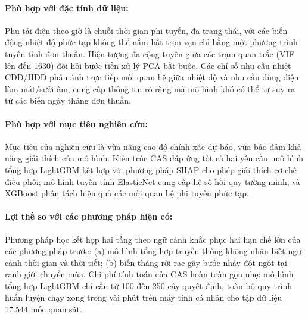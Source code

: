 \paragraph{Phù hợp với đặc tính dữ liệu:}
Phụ tải điện theo giờ là chuỗi thời gian phi tuyến, đa trạng thái, với các biến động nhiệt độ phức tạp không thể nắm bắt trọn vẹn chỉ bằng một phương trình tuyến tính đơn thuần. Hiện tượng đa cộng tuyến giữa các trạm quan trắc (VIF lên đến 1630) đòi hỏi bước tiền xử lý PCA bắt buộc. Các chỉ số nhu cầu nhiệt CDD/HDD phản ánh trực tiếp mối quan hệ giữa nhiệt độ và nhu cầu dùng điện làm mát/sưởi ấm, cung cấp thông tin rõ ràng mà mô hình khó có thể tự suy ra từ các biến ngày tháng đơn thuần.

\paragraph{Phù hợp với mục tiêu nghiên cứu:}
Mục tiêu của nghiên cứu là vừa nâng cao độ chính xác dự báo, vừa bảo đảm khả năng giải thích của mô hình. Kiến trúc CAS đáp ứng tốt cả hai yêu cầu: mô hình tổng hợp LightGBM kết hợp với phương pháp SHAP cho phép giải thích cơ chế điều phối; mô hình tuyến tính ElasticNet cung cấp hệ số hồi quy tường minh; và XGBoost phân tách hiệu quả các mối quan hệ phi tuyến phức tạp.

\paragraph{Lợi thế so với các phương pháp hiện có:}
Phương pháp học kết hợp hai tầng theo ngữ cảnh khắc phục hai hạn chế lớn của các phương pháp trước: (a) mô hình tổng hợp truyền thống không nhận biết ngữ cảnh thời gian và thời tiết; (b) biến tháng rời rạc gây bước nhảy đột ngột tại ranh giới chuyển mùa. Chi phí tính toán của CAS hoàn toàn gọn nhẹ: mô hình tổng hợp LightGBM chỉ cần từ 100 đến 250 cây quyết định, toàn bộ quy trình huấn luyện chạy xong trong vài phút trên máy tính cá nhân cho tập dữ liệu 17.544 mốc quan sát.

